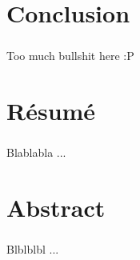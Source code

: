 \documentclass[a4paper,11pt]{report}
\begin{document}
\chapter*{Conclusion}
        \paragraph{}
Too much bullshit here :P
    \clearpage


%
\chapter*{Résumé}
\paragraph{}
Blablabla ...
    \clearpage


%
\chapter*{Abstract}
\paragraph{}
Blblblbl ...
    \clearpage


%

\clearpage


%


\end{document}
